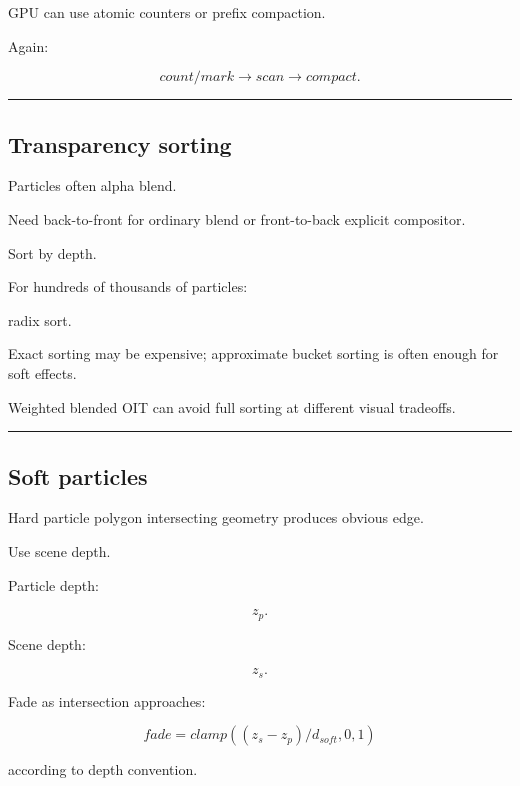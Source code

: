 GPU can use atomic counters or prefix compaction.

Again:

\[
count/mark
\rightarrow
scan
\rightarrow
compact.
\]

\begin{center}\rule{0.5\linewidth}{0.5pt}\end{center}

\subsection{Transparency sorting}\label{04-visual-computing-ii-ch040-transparency-sorting}

\hypertarget{04-visual-computing-ii-ch040-transparency-sorting}{}

Particles often alpha blend.

Need back-to-front for ordinary blend or front-to-back explicit compositor.

Sort by depth.

For hundreds of thousands of particles:

radix sort.

Exact sorting may be expensive; approximate bucket sorting is often enough for soft effects.

Weighted blended OIT can avoid full sorting at different visual tradeoffs.

\begin{center}\rule{0.5\linewidth}{0.5pt}\end{center}

\subsection{Soft particles}\label{04-visual-computing-ii-ch040-soft-particles}

\hypertarget{04-visual-computing-ii-ch040-soft-particles}{}

Hard particle polygon intersecting geometry produces obvious edge.

Use scene depth.

Particle depth:

\[
z_p.
\]

Scene depth:

\[
z_s.
\]

Fade as intersection approaches:

\[
\boxed{
fade=
clamp(
(z_s-z_p)/d_{soft},
0,1
)
}
\]

according to depth convention.

